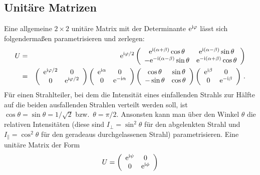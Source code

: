 \subsection{Unit\"are Matrizen}
\label{A_BK_Unitary}
Eine allgemeine $2\times 2$ unit\"are Matrix mit der Determinante ${\rm e}^{{\rm i}\varphi}$
l\"asst sich folgenderma\ss en parametrisieren und zerlegen:
\begin{eqnarray}
     U &=& {\rm e}^{{\rm i}\varphi/2} 
     \left( \begin{array}{cc}  {\rm e}^{{\rm i}(\alpha+\beta)} \cos \theta & {\rm e}^{{\rm i}(\alpha - \beta)} \sin \theta \\
     - {\rm e}^{-{\rm i}(\alpha - \beta)} \sin \theta & {\rm e}^{-{\rm i}(\alpha+\beta)} \cos \theta \end{array} \right)  \\
     &=&
     \left( \begin{array}{cc}  {\rm e}^{{\rm i}\varphi/2} & 0    \\
     0  & {\rm e}^{{\rm i}\varphi/2} \end{array} \right) 
          \left( \begin{array}{cc}  {\rm e}^{{\rm i}\alpha} & 0    \\
     0  & {\rm e}^{-{\rm i}\alpha} \end{array} \right) 
          \left( \begin{array}{cc}  \cos \theta & \sin \theta    \\
     - \sin \theta  & \cos \theta \end{array} \right) 
               \left( \begin{array}{cc}  {\rm e}^{{\rm i}\beta} & 0    \\
     0  & {\rm e}^{-{\rm i}\beta} \end{array} \right) \, .
\end{eqnarray}
F\"ur einen Strahlteiler, bei dem die Intensit\"at eines einfallenden Strahls zur H\"alfte
auf die beiden ausfallenden Strahlen verteilt werden soll, ist $\cos \theta = \sin \theta = 1/\sqrt{2}$
bzw.\ $\theta = \pi/2$. Ansonsten kann man \"uber den Winkel $\theta$ die relativen Intensit\"aten 
(diese sind $I_\perp=\sin^2\theta$ f\"ur den abgelenkten Strahl und $I_\parallel = \cos^2 \theta$ f\"ur den
geradeaus durchgelassenen Strahl) parametrisieren. Eine unit\"are Matrix der Form
\begin{equation}
           U = \left( \begin{array}{cc}  {\rm e}^{{\rm i}\psi} & 0  \\  0  & {\rm e}^{{\rm i}\phi} \end{array} \right) 
\end{equation}
